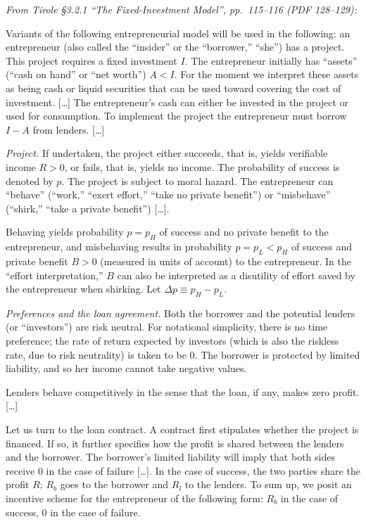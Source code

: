 \documentclass[11pt,a4paper]{article}
\begin{document}
\emph{From Tirole §3.2.1 ``The Fixed-Investment Model'', pp.~115--116 (PDF 128--129):}

Variants of the following entrepreneurial model will be used in the following: an entrepreneur (also
called the ``insider'' or the ``borrower,'' ``she'') has a project. This project requires a fixed
investment \(I\). The entrepreneur initially has ``assets'' (``cash on hand'' or ``net worth'')
\(A < I\). For the moment we interpret these assets as being cash or liquid securities that can be
used toward covering the cost of investment. {[}\ldots{]} The entrepreneur's cash can either be
invested in the project or used for consumption. To implement the project the entrepreneur must
borrow \(I - A\) from lenders. {[}\ldots{]}

\emph{Project.} If undertaken, the project either succeeds, that is, yields verifiable income
\(R > 0\), or fails, that is, yields no income. The probability of success is denoted by \(p\). The
project is subject to moral hazard. The entrepreneur can ``behave'' (``work,'' ``exert effort,''
``take no private benefit'') or ``misbehave'' (``shirk,'' ``take a private benefit'') {[}\ldots{]}.

Behaving yields probability \(p = p_H\) of success and no private benefit to the entrepreneur, and
misbehaving results in probability \(p = p_L < p_H\) of success and private benefit \(B > 0\)
(measured in units of account) to the entrepreneur. In the ``effort interpretation,'' \(B\) can also
be interpreted as a disutility of effort saved by the entrepreneur when shirking. Let
\(\Delta p \equiv p_H - p_L\).

\emph{Preferences and the loan agreement.} Both the borrower and the potential lenders (or
``investors'') are risk neutral. For notational simplicity, there is no time preference; the rate of
return expected by investors (which is also the riskless rate, due to risk neutrality) is taken to
be 0. The borrower is protected by limited liability, and so her income cannot take negative values.

Lenders behave competitively in the sense that the loan, if any, makes zero profit. {[}\ldots{]}

Let us turn to the loan contract. A contract first stipulates whether the project is financed. If
so, it further specifies how the profit is shared between the lenders and the borrower. The
borrower's limited liability will imply that both sides receive 0 in the case of failure
{[}\ldots{]}. In the case of success, the two parties share the profit \(R\); \(R_b\) goes to the
borrower and \(R_l\) to the lenders. To sum up, we posit an incentive scheme for the entrepreneur of
the following form: \(R_b\) in the case of success, 0 in the case of failure.
\end{document}
